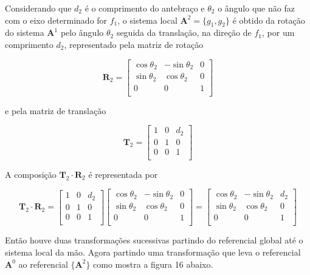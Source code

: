 Considerando que $d_2$ é o comprimento do antebraço e $\theta_2$ o ângulo que não faz com o eixo determinado for $f_1$, o sistema local $\mathbf{A}^2 = \{g_1, g_2\}$ é obtido da rotação do sistema $\mathbf{A}^1$ pelo ângulo $\theta_2$ seguida da translação, na direção de $f_1$, por um comprimento $d_2$, representado pela matriz de rotação

\[
\mathbf{R}_2 = \begin{bmatrix}
	\cos\theta_2 & -\sin\theta_2 & 0\\
	\sin\theta_2 & \cos\theta_2 & 0\\
	0 & 0 & 1\\
\end{bmatrix}
\]

\noindent e pela matriz de translação

\[
\mathbf{T}_2 = \begin{bmatrix}
	1 & 0 & d_2\\
	0 & 1 & 0\\
	0 & 0 & 1\\
\end{bmatrix}
\]

A composição $\mathbf{T}_2\cdot\mathbf{R}_2$ é representada por 

\[
\mathbf{T}_2\cdot\mathbf{R}_2 = \begin{bmatrix}
	1 & 0 & d_2\\
	0 & 1 & 0\\
	0 & 0 & 1\\
\end{bmatrix}
\begin{bmatrix}
	\cos\theta_2 & -\sin\theta_2 & 0\\
	\sin\theta_2 & \cos\theta_2 & 0\\
	0 & 0 & 1\\
\end{bmatrix}
=
\begin{bmatrix}
	\cos\theta_2 & -\sin\theta_2 & d_2\\
	\sin\theta_2 & \cos\theta_2 & 0\\
	0 & 0 & 1\\
\end{bmatrix}
\]

Então houve duas transformações sucessivas partindo do referencial global até o sistema local da mão. Agora partindo uma transformação que leva o referencial $\mathbf{A}^0$ ao referencial $\{\mathbf{A}^2\}$ como mostra a figura 16 abaixo.

